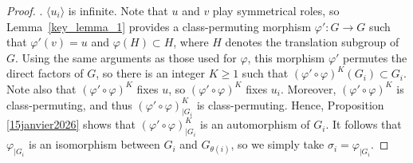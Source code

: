 \documentclass[a4paper, 11pt]{amsart}
\theoremstyle{definition}
\newtheorem{de}[te]{Definition}
\theoremstyle{remark}
\renewcommand{\geq}{\geqslant}
\begin{document}
\begin{proof}
\smallskip {}. $\langle u_i\rangle$ is infinite.
\newline 
Note that $u$ and $v$ play symmetrical roles, so Lemma~\ref{key_lemma_1} provides a class-permuting morphism $\varphi' : G\rightarrow G$ such that $\varphi'(v)=u$ and $\varphi(H)\subset H$, where $H$ denotes the translation subgroup of $G$. Using the same arguments as those used for $\varphi$, this morphism $\varphi'$ permutes the direct factors of $G$, so there is an integer $K\geq 1$ such that $(\varphi'\circ \varphi)^K(G_i)\subset G_i$. Note also that $(\varphi'\circ \varphi)^K$ fixes $u$, so $(\varphi'\circ \varphi)^K$ fixes $u_i$. Moreover, $(\varphi'\circ \varphi)^K$ is class-permuting, and thus $(\varphi'\circ \varphi)^K_{\vert G_i}$ is class-permuting. Hence, Proposition \ref{15janvier2026} shows that $(\varphi'\circ \varphi)^K_{\vert G_i}$ is an automorphism of $G_i$. It follows that $\varphi_{\vert G_i}$ is an isomorphism between $G_i$ and $G_{\theta(i)}$, so we simply take $\sigma_i=\varphi_{\vert G_i}$.\end{proof}





\end{document}
